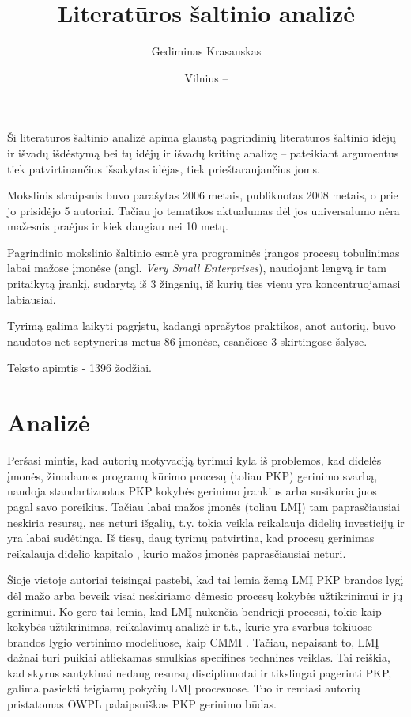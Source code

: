 \documentclass{VUMIFPSkursinis}
\title{Literatūros šaltinio analizė}
\author{Gediminas Krasauskas}
\date{Vilnius – \the\year}
\begin{document}
\maketitle

\tableofcontents

Ši literatūros šaltinio analizė apima glaustą pagrindinių literatūros šaltinio \cite{habra2008initiating} idėjų ir išvadų išdėstymą bei tų idėjų ir išvadų kritinę analizę – pateikiant argumentus tiek patvirtinančius išsakytas idėjas, tiek prieštaraujančius joms. 

Mokslinis straipsnis buvo parašytas 2006 metais, publikuotas 2008 metais, o prie jo prisidėjo 5 autoriai. Tačiau jo tematikos aktualumas dėl jos universalumo nėra mažesnis praėjus ir kiek daugiau nei 10 metų.

Pagrindinio mokslinio šaltinio esmė yra programinės įrangos procesų tobulinimas labai mažose įmonėse (angl. \textit{Very Small Enterprises}), naudojant lengvą ir tam pritaikytą įrankį, sudarytą iš 3 žingsnių, iš kurių ties vienu yra koncentruojamasi labiausiai.

Tyrimą galima laikyti pagrįstu, kadangi aprašytos praktikos, anot autorių, buvo naudotos net septynerius metus 86 įmonėse, esančiose 3 skirtingose šalyse.

Teksto apimtis - 1396 žodžiai.

\section{Analizė}
Peršasi mintis, kad autorių motyvaciją tyrimui kyla iš problemos, kad didelės įmonės, žinodamos programų kūrimo procesų (toliau PKP) gerinimo svarbą, naudoja standartizuotus PKP kokybės gerinimo įrankius arba susikuria juos pagal savo poreikius. Tačiau labai mažos įmonės (toliau LMĮ) tam paprasčiausiai neskiria resursų, nes neturi išgalių, t.y. tokia veikla reikalauja didelių investicijų ir yra labai sudėtinga. Iš tiesų, daug tyrimų patvirtina, kad procesų gerinimas reikalauja didelio kapitalo \cite{humphrey1991software} \cite{herbsleb1994benefits} \cite{diaz1997software} \cite{van2004measuring}, kurio mažos įmonės paprasčiausiai neturi. 

Šioje vietoje autoriai teisingai pastebi, kad tai lemia žemą LMĮ PKP brandos lygį dėl mažo arba beveik visai neskiriamo dėmesio procesų kokybės užtikrinimui ir jų gerinimui. Ko gero tai lemia, kad LMĮ nukenčia bendrieji procesai, tokie kaip kokybės užtikrinimas, reikalavimų analizė ir t.t., kurie yra svarbūs tokiuose brandos lygio vertinimo modeliuose, kaip CMMI \cite{peldzius2011comparison}. Tačiau, nepaisant to, LMĮ dažnai turi puikiai atliekamas smulkias specifines technines veiklas. Tai reiškia, kad skyrus santykinai nedaug resursų disciplinuotai ir tikslingai pagerinti PKP, galima pasiekti teigiamų pokyčių LMĮ procesuose. Tuo ir remiasi autorių pristatomas OWPL palaipsniškas PKP gerinimo būdas.
\end{document}
